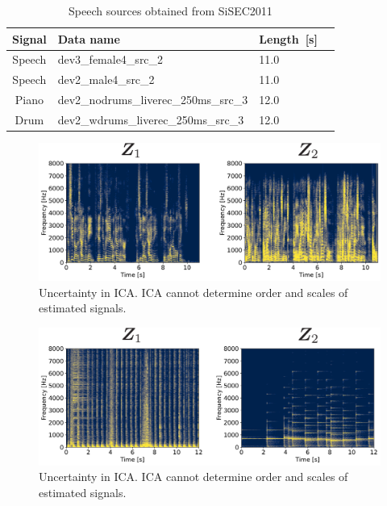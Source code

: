 \begin{table}[t]
  \begin{center}
   \caption{Speech sources obtained from SiSEC2011}
   \label{table:wav}
    \begin{tabular}{clll}\hline \hline
     Signal  & Data name &Length~[s]  \\ \hline
     Speech  & dev3\_female4\_src\_2 & 11.0  \\ \hline
     Speech  & dev2\_male4\_src\_2 &  11.0 \\ \hline
     Piano   & dev2\_nodrums\_liverec\_250ms\_src\_3 & 12.0\\ \hline
     Drum   & dev2\_wdrums\_liverec\_250ms\_src\_3 & 12.0 \\ \hline 
     \hline
    \end{tabular}
   \end{center}
\end{table}
\begin{figure}[t]
  \begin{center}
      \includegraphics[width=0.95\columnwidth]{figures/audio_init_spec.pdf}
  \end{center}
  \vspace{-8pt}
\caption{Uncertainty in ICA. ICA cannot determine order and scales of estimated signals.}
\label{fig:audio}
\end{figure}

\begin{figure}[t]
  \begin{center}
      \includegraphics[width=0.95\columnwidth]{figures/Drum_init_spec.pdf}
  \end{center}
  \vspace{-8pt}
\caption{Uncertainty in ICA. ICA cannot determine order and scales of estimated signals.}
\label{fig:drum}
\end{figure}


